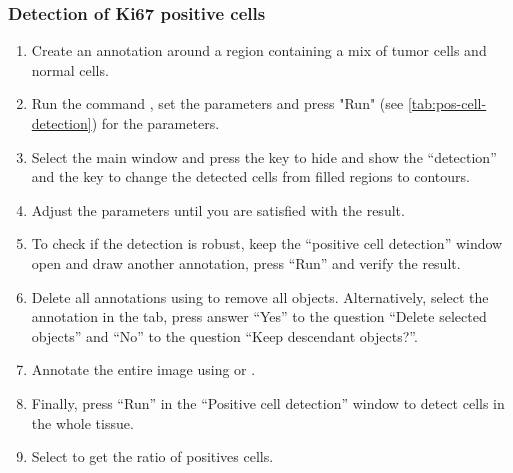 \documentclass[a4paper,DIV=17,dvipsnames,headsepline]{scrartcl}
\begin{document}
\subsubsection{Detection of Ki67 positive cells} \label{sss:positive-cell-detection}
\begin{enumerate}
\item Create an annotation around a region containing a mix of tumor cells and normal cells. 
\item Run the command , set the parameters and press "Run" (see \ref{tab:pos-cell-detection}) for the parameters.
\item Select the main window and press the key  to hide and show the ``detection'' and the key  to change the detected cells from filled regions to contours.
\item Adjust the parameters until you are satisfied with the result.
\item To check if the detection is robust, keep the ``positive cell detection'' window open and draw another annotation, press ``Run'' and verify the result. 
\item Delete all annotations using  to remove all objects. Alternatively, select the annotation in the  tab, press  answer ``Yes'' to the question ``Delete selected objects'' and ``No'' to the question ``Keep descendant objects?''.
\item Annotate the entire image using  or .
\item Finally, press ``Run'' in the ``Positive cell detection'' window to detect cells in the whole tissue.
\item Select  to get the ratio of positives cells.
\end{enumerate}

\end{document}
